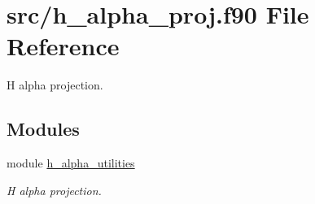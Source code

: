 \hypertarget{h__alpha__proj_8f90}{}\section{src/h\+\_\+alpha\+\_\+proj.f90 File Reference}
\label{h__alpha__proj_8f90}


H alpha projection.  


\subsection*{Modules}
\begin{DoxyCompactItemize}
\item 
module \hyperlink{namespaceh__alpha__utilities}{h\+\_\+alpha\+\_\+utilities}
\begin{DoxyCompactList}\small\item\em H alpha projection. \end{DoxyCompactList}\end{DoxyCompactItemize}
